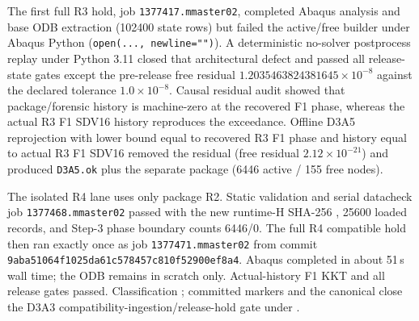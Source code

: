 The first full R3 hold, job \texttt{1377417.mmaster02}, completed Abaqus
analysis and base ODB extraction (102400 state rows) but failed the active/free
builder under Abaqus Python (\texttt{open(..., newline="")}). A deterministic
no-solver postprocess replay under Python 3.11 closed that architectural defect
and passed all release-state gates except the pre-release free residual
$1.2035463824381645\times10^{-8}$ against the declared tolerance $1.0\times10^{-8}$.
Causal residual audit showed that package/forensic history is machine-zero at
the recovered F1 phase, whereas the actual R3 F1 SDV16 history reproduces the
exceedance. Offline D3A5 reprojection with lower bound equal to recovered R3 F1
phase and history equal to actual R3 F1 SDV16 removed the residual (free residual
$2.12\times10^{-21}$) and produced \texttt{D3A5.ok} plus the separate
 package (6446 active / 155 free nodes).

The isolated R4 lane uses only package R2. Static validation and serial
datacheck job \texttt{1377468.mmaster02} passed with the new runtime-H SHA-256
,
25600 loaded records, and Step-3 phase boundary counts 6446/0. The full R4
compatible hold then ran exactly once as job \texttt{1377471.mmaster02} from
commit \texttt{9aba51064f1025da61c578457c810f52900ef8a4}. Abaqus completed in
about 51\,s wall time; the ODB remains in scratch only. Actual-history F1 KKT
and all release gates passed. Classification
; committed markers
and the canonical
close the D3A3 compatibility-ingestion/release-hold gate under
.


